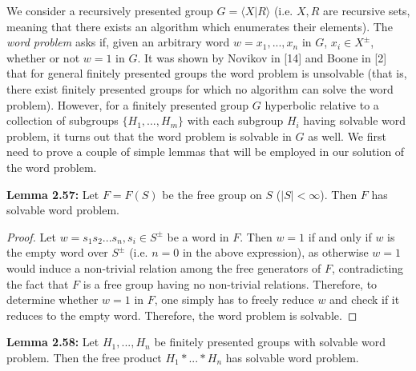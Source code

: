 \documentclass[12pt]{article}
\newcommand{\vs}{\vskip10pt}
\begin{document}
	We consider a recursively presented group $G = \langle X \vert R \rangle$ (i.e. $X,R$ are recursive sets, meaning that there exists an algorithm which enumerates their elements). The \textit{word problem} asks if, given an arbitrary word $w = x_1,...,x_n$ in $G$, $x_i \in X^{\pm}$, whether or not $w = 1$ in $G$. It was shown by Novikov in [14] and Boone in [2] that for general finitely presented groups the word problem is unsolvable (that is, there exist finitely presented groups for which no algorithm can solve the word problem). However, for a finitely presented group $G$ hyperbolic relative to a collection of subgroups $\{H_1,...,H_m\}$ with each subgroup $H_i$ having solvable word problem, it turns out that the word problem is solvable in $G$ as well. We first need to prove a couple of simple lemmas that will be employed in our solution of the word problem. 
	
	\vs 
	
	\textbf{Lemma 2.57: } Let $F = F(S)$ be the free group on $S$ ($\vert S \vert < \infty$). Then $F$ has solvable word problem. 
	
	\begin{proof}
		
		Let $w = s_1 s_2 ... s_n, s_i \in S^{\pm}$ be a word in $F$. Then $w = 1$ if and only if $w$ is the empty word over $S^{\pm}$ (i.e. $n = 0$ in the above expression), as otherwise $w=1$ would induce a non-trivial relation among the free generators of $F$, contradicting the fact that $F$ is a free group having no non-trivial relations. Therefore, to determine whether $w=1$ in $F$, one simply has to freely reduce $w$ and check if it reduces to the empty word. Therefore, the word problem is solvable. 
		
	\end{proof}
	
	\vs 
	
	\textbf{Lemma 2.58: } Let $H_1,...,H_n$ be finitely presented groups with solvable word problem. Then the free product $H_1 * ... * H_n$ has solvable word problem. 
	
\end{document}
